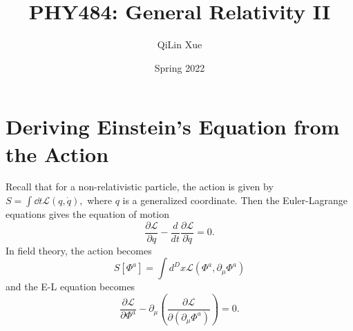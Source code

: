 \documentclass{article}
\title{PHY484: General Relativity II}
\author{QiLin Xue}
\date{Spring 2022}
\numberwithin{equation}{section}
\begin{document}
\maketitle
\tableofcontents
\newpage
\section{Deriving Einstein's Equation from the Action}
Recall that for a non-relativistic particle, the action is given by $S = \int \dd{t} \mathcal{L}(q,\dot{q}),$ where $q$ is a generalized coordinate. Then the Euler-Lagrange equations gives the equation of motion 
\begin{equation}
    \frac{\partial \mathcal{L}}{\partial q} - \frac{d}{dt}\frac{\partial \mathcal{L}}{\partial \dot{q}} = 0.
\end{equation}
In field theory, the action becomes 
\begin{equation*}
    S[\Phi^a] = \int d^D x \mathcal{L}(\Phi^a,\partial_\mu \Phi^a)
\end{equation*}
and the E-L equation becomes 
\begin{equation}
    \frac{\partial \mathcal{L}}{\partial \Phi^a} - \partial_\mu \left(\frac{\partial \mathcal{L}}{\partial(\partial_\mu \Phi^a)}\right) = 0.
\end{equation}
\end{document}
